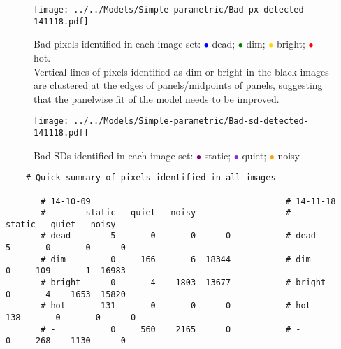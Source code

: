 \documentclass[10pt,fleqn]{article}
\begin{document}
\begin{figure}[!h]
\caption{Bad pixels identified in each image set: 
\textcolor{blue}{$\bullet$} dead; \textcolor{green}{$\bullet$} dim;  \textcolor{gold}{$\bullet$} bright; \textcolor{red}{$\bullet$} hot.\\
Vertical lines of pixels identified as dim or bright in the black images are clustered at the edges of panels/midpoints of panels, suggesting that the panelwise fit of the model needs to be improved.}
\texttt{[image: ../../Models/Simple-parametric/Bad-px-detected-141118.pdf]}
\end{figure}

\begin{figure}[!h]
\caption{Bad SDs identified in each image set: 
\textcolor{purple}{$\bullet$} static; \textcolor{BlueViolet}{$\bullet$} quiet;  \textcolor{orange}{$\bullet$} noisy}
\texttt{[image: ../../Models/Simple-parametric/Bad-sd-detected-141118.pdf]}
\end{figure}

\begin{footnotesize}
\begin{verbatim}
	# Quick summary of pixels identified in all images
	
       # 14-10-09                                       # 14-11-18		
       #        static   quiet   noisy      -           #        static   quiet   noisy      -
       # dead        5       0       0      0           # dead        5       0       0      0
       # dim         0     166       6  18344           # dim         0     109       1  16983
       # bright      0       4    1803  13677           # bright      0       4    1653  15820
       # hot       131       0       0      0           # hot       138       0       0      0
       # -           0     560    2165      0           # -           0     268    1130      0
\end{verbatim}
\end{footnotesize}

\end{document}
